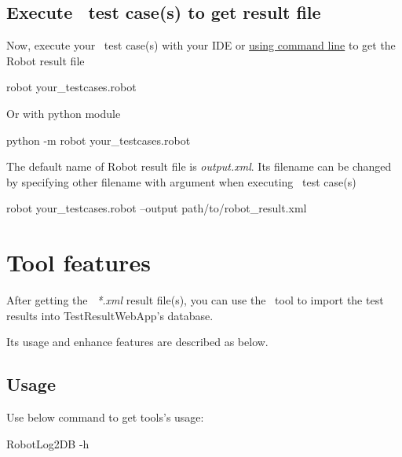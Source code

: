   \subsection{Execute \rfwcore\ test case(s) to get result file}
    Now, execute your \rfwcore\ test case(s) with your IDE or
    \href{https://robotframework.org/robotframework/latest/RobotFrameworkUserGuide.html#starting-test-execution}
    {using command line} to get the Robot result file
\begin{robotlog}
robot your_testcases.robot
\end{robotlog}
    Or with python module
\begin{robotlog}
python -m robot your_testcases.robot
\end{robotlog}

    The default name of Robot result file is \emph{output.xml}. Its filename can
    be changed by specifying other filename with argument 
    when executing \rfwcore\ test case(s)
\begin{robotlog}
robot your_testcases.robot --output path/to/robot_result.xml
\end{robotlog}

\newpage
\hypertarget{description-tool-features}{%
\section{Tool features}\label{description-tool-features}}
  After getting the \rfwcore\ \emph{*.xml} result file(s), you can use the \pkg\
  tool to import the test results into TestResultWebApp's database.

  Its usage and enhance features are described as below.

  \subsection{Usage}
    Use below command to get tools's usage:
\begin{robotlog}
RobotLog2DB -h
\end{robotlog}

